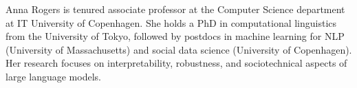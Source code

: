 Anna Rogers is tenured associate professor at the Computer Science department at IT University of Copenhagen. She holds a PhD in computational linguistics from the University of Tokyo, followed by postdocs in machine learning for NLP (University of Massachusetts) and social data science (University of Copenhagen). Her research focuses on interpretability, robustness, and sociotechnical aspects of large language models.